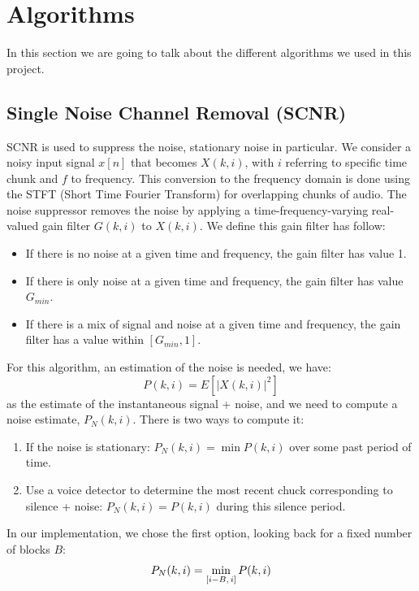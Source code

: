 \documentclass[11pt,a4paper,titlepage]{report}
\providecommand{\tightlist}{%
	\setlength{\itemsep}{0pt}\setlength{\parskip}{0pt}}
\begin{document}
\section{Algorithms}
\hspace*{0.6cm}
In this section we are going to talk about the different algorithms we used in this project.
\subsection{Single Noise Channel Removal (SCNR)}
\label{sec:SCNR}
\hspace*{0.6cm}
SCNR is used to suppress the noise, stationary noise in particular. We consider a noisy input signal $ x[n] $ that becomes $ X(k,i) $, with $ i $ referring to specific time chunk and $ f $ to frequency. This conversion to the frequency domain is done using the STFT (Short Time Fourier Transform) for overlapping chunks of audio. The noise suppressor removes the noise by applying a time-frequency-varying real-valued gain filter $ G(k,i) $ to $ X(k,i) $. We define this gain filter has follow:
\begin{itemize}
	\tightlist
	\item If there is no noise at a given time and frequency, the gain filter has value 1.
	\item If there is only noise at a given time and frequency, the gain filter has value $ G_{min} $.
	\item If there is a mix of signal and noise at a given time and frequency, the gain filter has a value within $ [G_{min}, 1] $.
\end{itemize}
For this algorithm, an estimation of the noise is needed, we have:
 \[P(k,i) = E[|X(k,i)|^2]  \]
as the estimate of the instantaneous signal + noise, and we need to compute a noise estimate, $ P_{N}(k,i) $. There is two ways to compute it:
\begin{enumerate}
	\tightlist
	\item If the noise is stationary: $ P_{N}(k,i) = \min P(k,i) $ over some past period of time.
	\item Use a voice detector to determine the most recent chuck corresponding to silence + noise: $ P_{N}(k,i) = P(k,i) $ during this silence period.
\end{enumerate}
In our implementation, we chose the first option, looking back for a fixed number of blocks $ B $:
\begin{equation}
P_{N}(k,i) = \min_{[i- B, \hspace{0.05cm}i]} P(k,i)
\end{equation} 
\end{document}
